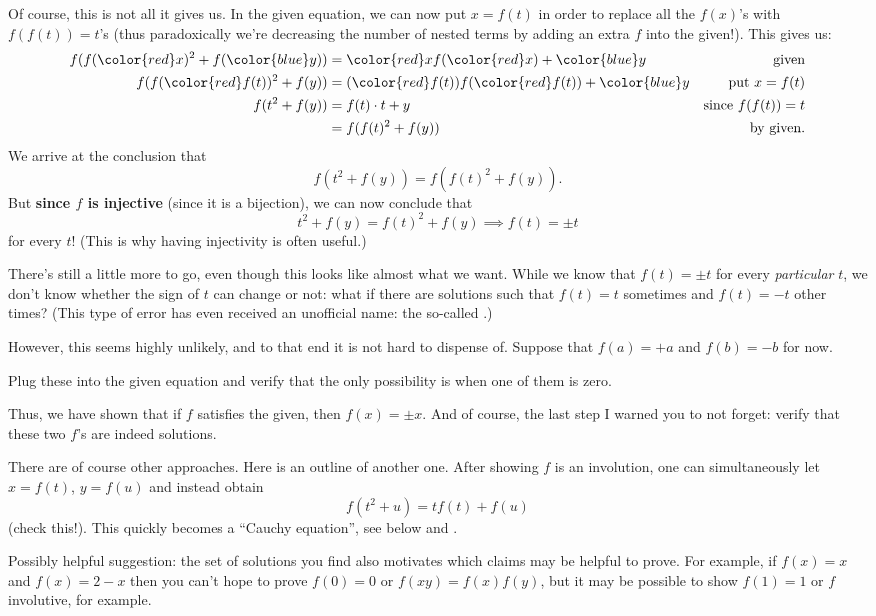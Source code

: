 \documentclass[11pt]{scrartcl}
\begin{document}
\begin{soln}
  Of course, this is not all it gives us.
  In the given equation, we can now put $x=f(t)$
  in order to replace all the $f(x)$'s with $f(f(t))=t$'s
  (thus paradoxically we're decreasing the number of nested terms
  by adding an extra $f$ into the given!).
  This gives us:
  \begin{align*}
    f(f({\color{red} x})^2+f({\color{blue} y}))
    &= {\color{red} x}f({\color{red} x}) + {\color{blue} y} & \text{given} \\
    f(f({\color{red} f(t)})^2+f(y))
    &= ({\color{red} f(t)})f({\color{red} f(t)}) + {\color{blue} y} & \text{put $x=f(t)$} \\
    f(t^2 + f(y)) &= f(t) \cdot t + y & \text{since } f(f(t)) = t \\
    &= f(f(t)^2+f(y)) & \text{by given}.
  \end{align*}
  We arrive at the conclusion that
  \[ f(t^2+f(y)) = f(f(t)^2+f(y)). \]
  But \textbf{since $f$ is injective}
  (since it is a bijection),
  we can now conclude that
  \[ t^2 + f(y) = f(t)^2 + f(y) \implies f(t) = \pm t \]
  for every $t$!
  (This is why having injectivity is often useful.)

  There's still a little more to go, even though this looks like almost what we want.
  While we know that $f(t) = \pm t$ for every \emph{particular} $t$,
  we don't know whether the sign of $t$ can change or not:
  what if there are solutions such that $f(t) = t$ sometimes and $f(t) = -t$ other times?
  (This type of error has even received an unofficial name:
  the so-called .)

  However, this seems highly unlikely, and to that end it is not hard to dispense of.
  Suppose that $f(a) = +a$ and $f(b) = -b$ for now.
  \begin{exercise}
    Plug these into the given equation and verify that the only possibility
    is when one of them is zero.
  \end{exercise}
  Thus, we have shown that if $f$ satisfies the given, then $f(x) = \pm x$.
  And of course, the last step I warned you to not forget:
  verify that these two $f$'s are indeed solutions.
\end{soln}
\begin{remark}
  There are of course other approaches.
  Here is an outline of another one.
  After showing $f$ is an involution,
  one can simultaneously let $x = f(t)$, $y = f(u)$
  and instead obtain \[ f(t^2 + u) = t f(t) + f(u) \]
  (check this!).
  This quickly becomes a ``Cauchy equation'',
  see below and .
\end{remark}
\begin{remark}
  Possibly helpful suggestion:
  the set of solutions you find also motivates
  which claims may be helpful to prove.
  For example, if $f(x) = x$ and $f(x) = 2-x$
  then you can't hope to prove $f(0)=0$ or $f(xy) = f(x)f(y)$,
  but it may be possible to show $f(1) = 1$ or $f$ involutive,
  for example.
\end{remark}
\end{document}
